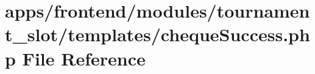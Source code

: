\hypertarget{frontend_2modules_2tournament__slot_2templates_2cheque_success_8php}{\section{apps/frontend/modules/tournament\-\_\-slot/templates/cheque\-Success.php File Reference}
\label{frontend_2modules_2tournament__slot_2templates_2cheque_success_8php}
}

